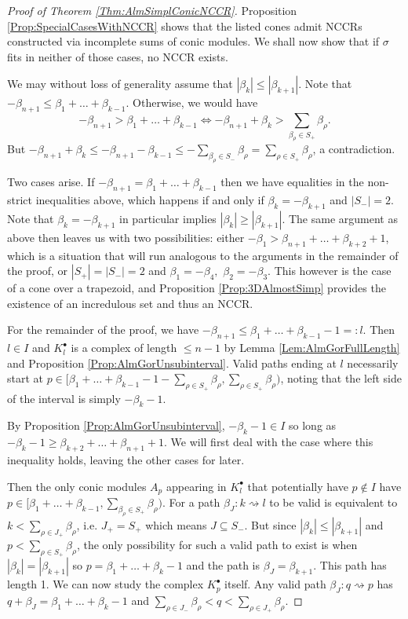 \documentclass[reqno, 12pt]{amsart}
\theoremstyle{definition}
\numberwithin{equation}{section}
\begin{document}
\begin{proof}[Proof of Theorem \ref{Thm:AlmSimplConicNCCR}]
Proposition \ref{Prop:SpecialCasesWithNCCR} shows that the listed cones admit NCCRs constructed via incomplete sums of conic modules. We shall now show that if $\sigma$ fits in neither of those cases, no NCCR exists.

We may without loss of generality assume that $|\beta_k|\le |\beta_{k+1}|$. Note that $-\beta_{n+1}\le \beta_1+\dots+\beta_{k-1}$. Otherwise, we would have
    \[-\beta_{n+1}>\beta_1+\dots+\beta_{k-1}
    \Leftrightarrow -\beta_{n+1}+\beta_k>\sum_{\beta_\rho\in S_+}\beta_\rho. \]
    But $-\beta_{n+1}+\beta_k\le -\beta_{n+1}-\beta_{k-1}\le -\sum_{\beta_\rho\in S_-}\beta_\rho=\sum_{\rho\in S_+}\beta_\rho$, a contradiction.

Two cases arise. If $-\beta_{n+1}=\beta_1+\dots+\beta_{k-1}$ then we have equalities in the non-strict inequalities above, which happens if and only if $\beta_k=-\beta_{k+1}$ and $|S_-|=2$. Note that $\beta_k=-\beta_{k+1}$ in particular implies $|\beta_k|\ge|\beta_{k+1}|$. The same argument as above then leaves us with two possibilities: either $-\beta_1>\beta_{n+1}+\dots+\beta_{k+2}+1$, which is a situation that will run analogous to the arguments in the remainder of the proof, or $|S_+|=|S_-|=2$ and $\beta_1=-\beta_4,$ $\beta_2=-\beta_3$. This however is the case of a cone over a trapezoid, and Proposition \ref{Prop:3DAlmostSimp} provides the existence of an incredulous set and thus an NCCR.

For the remainder of the proof, we have $-\beta_{n+1}\le \beta_1+\dots+\beta_{k-1}-1=:l$. Then $l\in I$ and $K_l^\bullet$ is a complex of length $\le n-1$ by Lemma \ref{Lem:AlmGorFullLength} and Proposition \ref{Prop:AlmGorUnsubinterval}. Valid paths ending at $l$ necessarily start at $p\in [\beta_1+\dots+\beta_{k-1}-1-\sum_{\rho\in S_+}\beta_\rho,\sum_{\rho\in S_+}\beta_\rho)$, noting that the left side of the interval is simply $-\beta_k-1$. 

By Proposition \ref{Prop:AlmGorUnsubinterval}, $-\beta_k-1\in I$ so long as $-\beta_k-1\ge \beta_{k+2}+\dots+\beta_{n+1}+1$. We will first deal with the case where this inequality holds, leaving the other cases for later.  

Then the only conic modules $A_p$ appearing in $K_l^\bullet$ that potentially have $p\not\in I$ have $p\in [\beta_1+\dots+\beta_{k-1},\sum_{\beta_\rho\in S_+}\beta_\rho)$. For a path $\beta_J:k\rightsquigarrow l$ to be valid is equivalent to $k<\sum_{\rho\in J_+}\beta_\rho$, i.e. $J_+=S_+$ which means $J\subseteq S_-$. But since $|\beta_k|\le|\beta_{k+1}|$ and $p<\sum_{\rho\in S_+}\beta_\rho$, the only possibility for such a valid path to exist is when $|\beta_k|=|\beta_{k+1}|$ so $p=\beta_1+\dots+\beta_k-1$ and the path is $\beta_J=\beta_{k+1}$. This path has length 1. We can now study the complex $K_p^\bullet$ itself. Any valid path $\beta_J:q\rightsquigarrow p$ has $q+\beta_J=\beta_1+\dots+\beta_k-1$ and $\sum_{\rho\in J_-}\beta_\rho<q<\sum_{\rho\in J_+}\beta_\rho$.


\end{proof}
\end{document}
